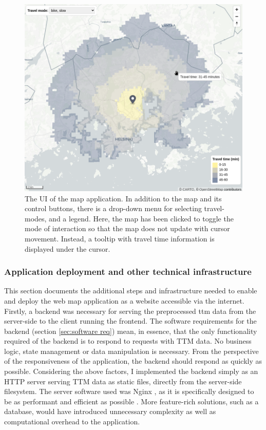 \begin{figure}[H]
	\centering
	\includegraphics[width=\textwidth]{visual/figures/screenshots/frontend.png}
	\caption{
		The UI of the map application.
		In addition to the map and its control buttons,
		there is a drop-down menu for selecting travel-modes, and a legend.
		Here, the map has been clicked to toggle the mode of interaction
		so that the map does not update with cursor movement.
		Instead, a tooltip with travel time information is displayed under the cursor.
	}
	\label{fig:frontend screenshot}
\end{figure}


\subsubsection{Application deployment and other technical infrastructure}

This section documents the additional steps and infrastructure
needed to enable and deploy the web map application as
a website accessible via the internet.
Firstly,
a backend was necessary for serving the preprocessed \acrshort{ttm} data
from the server-side to the client running the frontend.
The software requirements for the backend
(section \ref{sec:software req}) mean, in essence,
that the only functionality required of the backend
is to respond to requests with TTM data.
No business logic, state management or data manipulation is necessary.
From the perspective of the responsiveness of the application,
the backend should respond as quickly as possible.
Considering the above factors,
I implemented the backend
simply as an HTTP server serving TTM data as static files,
directly from the server-side filesystem.
The server software used was Nginx \parencite{nginx},
as it is specifically designed to be as performant and efficient as possible
\parencite{dej2020, ree2008}.
More feature-rich solutions, such as a database,
would have introduced unnecessary complexity
as well as computational overhead to the application.

